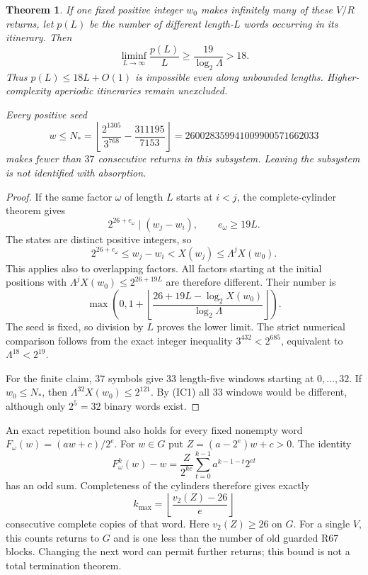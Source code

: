 \documentclass[11pt]{article}
\newtheorem{theorem}{Theorem}
\begin{document}
\begin{theorem}\label{thm:itinerarycomplexity}
If one fixed positive integer $w_0$ makes infinitely many of these
$V/R$ returns, let $p(L)$ be the number of different length-$L$
words occurring in its itinerary. Then
\[
 \liminf_{L\to\infty}\frac{p(L)}L
 \ge\frac{19}{\log_2\Lambda}>18.
\]
Thus $p(L)\le18L+O(1)$ is impossible even along unbounded lengths.
Higher-complexity aperiodic itineraries remain unexcluded.

Every positive seed
\[
 w\le N_*=
 \left\lfloor\frac{2^{1305}}{3^{768}}-\frac{311195}{7153}\right\rfloor
 =260028359941009900571662033
\]
makes fewer than $37$ consecutive returns in this subsystem.
Leaving the subsystem is not identified with absorption.
\end{theorem}
\begin{proof}
If the same factor $\omega$ of length $L$ starts at $i<j$, the
complete-cylinder theorem gives
\[
 2^{26+e_\omega}\mid(w_j-w_i),\qquad e_\omega\ge19L.
\]
The states are distinct positive integers, so
\[
 2^{26+e_\omega}\le w_j-w_i<X(w_j)\le\Lambda^jX(w_0).
 \tag{IC1}
\]
This applies also to overlapping factors. All factors starting at the
initial positions with $\Lambda^jX(w_0)\le2^{26+19L}$ are therefore
different. Their number is
\[
 \max\left(0,1+\left\lfloor
 \frac{26+19L-\log_2X(w_0)}{\log_2\Lambda}
 \right\rfloor\right).
\]
The seed is fixed, so division by $L$ proves the lower limit.
The strict numerical comparison follows from the exact integer inequality
$3^{432}<2^{685}$, equivalent to $\Lambda^{18}<2^{19}$.

For the finite claim, $37$ symbols give $33$ length-five windows
starting at $0,\ldots,32$. If $w_0\le N_*$, then
$\Lambda^{32}X(w_0)\le2^{121}$. By (IC1) all $33$ windows would
be different, although only $2^5=32$ binary words exist.
\end{proof}

An exact repetition bound also holds for every fixed nonempty word
$F_\omega(w)=(aw+c)/2^e$. For $w\in G$ put
$Z=(a-2^e)w+c>0$. The identity
\[
 F_\omega^k(w)-w=
 \frac{Z}{2^{ke}}\sum_{t=0}^{k-1}a^{k-1-t}2^{et}
\]
has an odd sum. Completeness of the cylinders therefore gives exactly
\[
 k_{\max}=\left\lfloor\frac{v_2(Z)-26}{e}\right\rfloor
\]
consecutive complete copies of that word. Here $v_2(Z)\ge26$ on $G$.
For a single $V$, this counts returns to $G$ and is one less than the
number of old guarded R67 blocks. Changing the next word can permit
further returns; this bound is not a total termination theorem.
\end{document}
